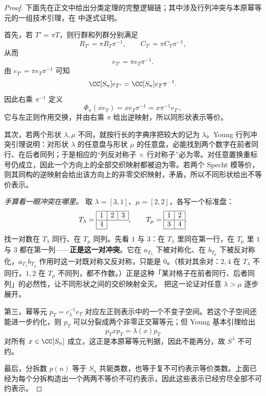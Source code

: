 \begin{proof}
下面先在正文中给出分类定理的完整逻辑链；其中涉及行列冲突与本原幂等元的一组技术引理，在 中逐式证明。

首先，若 $T'=\pi T$，则行群和列群分别满足
\[
R_{T'}=\pi R_T\pi^{-1},
\qquad
C_{T'}=\pi C_T\pi^{-1},
\]
从而
\[
e_{T'}=\pi e_T\pi^{-1}.
\]
由 $e_{T'}=\pi e_T\pi^{-1}$ 可知
\[
\CC[S_n]e_{T'}=\CC[S_n]e_T\pi^{-1}.
\]
因此右乘 $\pi^{-1}$ 定义
\[
\Phi_\pi(xe_T)=xe_T\pi^{-1}=x\pi^{-1}e_{T'},
\]
它与左正则作用交换，并由右乘 $\pi$ 给出逆映射，所以同形状表示等价。

其次，若两个形状 $\lambda,\mu$ 不同，就按行长的字典序把较大的记为 $\lambda$。Young 行列冲突引理说明：对形状 $\lambda$ 的任意盘与形状 $\mu$ 的任意盘，必能找到两个数字在前者同行、在后者同列；于是相应的“列反对称子 $\times$ 行对称子”必为零。对任意置换重标号仍成立，因此一个方向上的全部交织映射都被迫为零。若两个 Specht 模等价，则其同构的逆映射会给出该方向上的非零交织映射，矛盾，所以不同形状给出不等价表示。

\noindent\emph{手算看一眼冲突在哪里。} 取 $\lambda=[3,1]$、$\mu=[2,2]$，各写一个标准盘：
\[
T_\lambda=\begin{array}{|c|c|c|}\hline 1&2&3\\ \hline 4\\ \cline{1-1}\end{array},
\qquad
T_\mu=\begin{array}{|c|c|}\hline 1&2\\ \hline 3&4\\ \hline\end{array}.
\]
找一对数在 $T_\lambda$ 同行、在 $T_\mu$ 同列。先看 $1$ 与 $3$：在 $T_\lambda$ 里同在第一行，在 $T_\mu$ 里 $1$ 与 $3$ 都在第一列——\textbf{正是这一对冲突}。它在 $a_{T_\lambda}$ 下被对称化、在 $b_{T_\mu}$ 下被反对称化，$a_{T_\lambda}b_{T_\mu}$ 作用时这一对既对称又反对称，只能是 $0$。（核对其余对：$2,4$ 在 $T_\lambda$ 不同行，$1,2$ 在 $T_\mu$ 不同列，都不作数。）正是这种「某对格子在前者同行、后者同列」的必然性，让不同形状之间的交织映射全灭。 把这一论证对任意 $\lambda>\mu$ 逐步展开。

第三，幂等元 $p_T=c_\lambda^{-1}e_T$ 对应左正则表示中的一个不变子空间。若这个子空间还能进一步约化，则 $p_T$ 可以分裂成两个非零正交幂等元；但 Young 基本引理给出
\[
p_T x p_T=\lambda(x)p_T
\]
对所有 $x\in\CC[S_n]$ 成立，这正是本原幂等元判据，因此不能再分，故 $S^\lambda$ 不可约。

最后，分拆数 $p(n)$ 等于 $S_n$ 共轭类数，也等于复不可约表示等价类数。上面已经为每个分拆构造出一个两两不等价不可约表示，因此这些表示已经穷尽全部不可约表示。
\end{proof}


